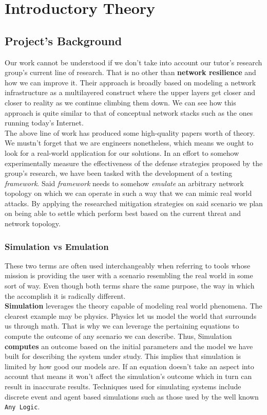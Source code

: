 \chapter{Introductory Theory}
    \section{Project's Background}
        Our work cannot be understood if we don't take into account our tutor's research group's current line of research. That is no other than \textbf{network resilience} and how we can improve it. Their approach is broadly based on modeling a network infrastructure as a multilayered construct where the upper layers get closer and closer to reality as we continue climbing them down. We can see how this approach is quite similar to that of conceptual network stacks such as the ones running today's Internet.\\

        The above line of work has produced some high-quality papers worth of theory. We mustn't forget that we are engineers nonetheless, which means we ought to look for a real-world application for our solutions. In an effort to somehow experimentally measure the effectiveness of the defense strategies proposed by the group's research, we have been tasked with the development of a testing \textit{framework}. Said \textit{framework} needs to somehow \textit{emulate} an arbitrary network topology on which we can operate in such a way that we can mimic real world attacks. By applying the researched mitigation strategies on said scenario we plan on being able to settle which perform best based on the current threat and network topology.\\

        \subsection{Simulation vs Emulation}
            These two terms are often used interchangeably when referring to tools whose mission is providing the user with a scenario resembling the real world in some sort of way. Even though both terms share the same purpose, the way in which the accomplish it is radically different.\\

            \textbf{Simulation} leverages the theory capable of modeling real world phenomena. The clearest example may be physics. Physics let us model the world that surrounds us through math. That is why we can leverage the pertaining equations to compute the outcome of any scenario we can describe. Thus, Simulation \textbf{computes} an outcome based on the initial parameters and the model we have built for describing the system under study. This implies that simulation is limited by how good our models are. If an equation doesn't take an aspect into account that means it won't affect the simulation's outcome which in turn can result in inaccurate results. Techniques used for simulating systems include discrete event and agent based simulations such as those used by the well known \texttt{Any Logic}.\\


